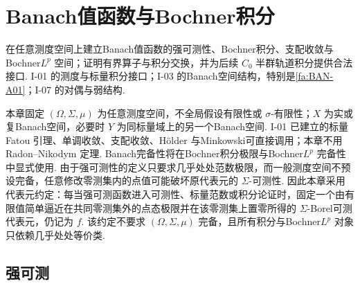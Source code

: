 \chapter{Banach值函数与Bochner积分}\label{chap:II-04}
\FAChapterOpening
{在任意测度空间上建立Banach值函数的强可测性、Bochner积分、支配收敛与Bochner\(\displaystyle L^p\) 空间；证明有界算子与积分交换，并为后续 \(\displaystyle C_0\) 半群轨道积分提供合法接口.}
{I-01 的测度与标量积分接口；I-03 的Banach空间结构，特别是\autoref{fa:BAN-A01}；I-07 的对偶与弱结构.}
{\begin{center}
\end{center}}

本章固定 \(\displaystyle(\Omega,\Sigma,\mu)\) 为任意测度空间，不全局假设有限性或 \(\displaystyle\sigma\)-有限性；\(\displaystyle X\) 为实或复Banach空间，必要时 \(\displaystyle Y\) 为同标量域上的另一个Banach空间. I-01 已建立的标量 Fatou 引理、单调收敛、支配收敛、Hölder 与Minkowski可直接调用；本章不用 Radon--Nikodym 定理. Banach完备性将在Bochner积分极限与Bochner\(\displaystyle L^p\) 完备性中显式使用.
由于强可测性的定义只要求几乎处处范数极限，而一般测度空间不预设完备，任意修改零测集内的点值可能破坏原代表元的 \(\displaystyle\Sigma\)-可测性. 因此本章采用代表元约定：每当强可测函数进入可测性、标量范数或积分论证时，固定一个由有限值简单逼近在共同零测集外的点态极限并在该零测集上置零所得的 \(\displaystyle\Sigma\)-Borel可测代表元，仍记为 \(\displaystyle f\). 该约定不要求 \(\displaystyle(\Omega,\Sigma,\mu)\) 完备，且所有积分与Bochner\(\displaystyle L^p\) 对象只依赖几乎处处等价类.

\newpage
\section{强可测}\label{sec:ii04-strong-measurability}

